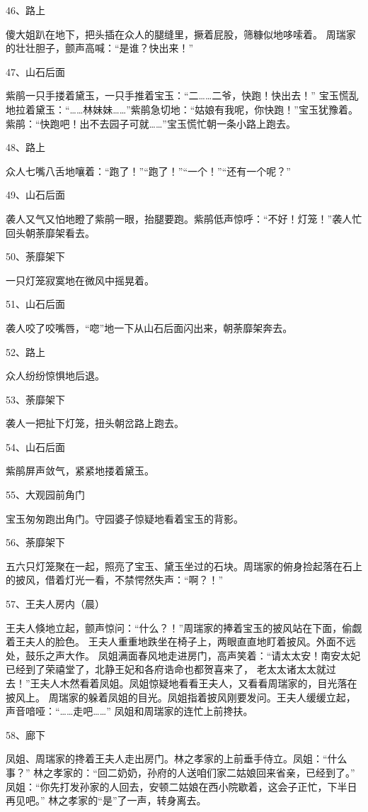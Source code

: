 46、路上\par
傻大姐趴在地下，把头插在众人的腿缝里，撅着屁股，筛糠似地哆嗦着。
周瑞家的壮壮胆子，颤声高喊：“是谁？快出来！”

47、山石后面\par
紫鹃一只手搂着黛玉，一只手推着宝玉：“二……二爷，快跑！快出去！”
宝玉慌乱地拉着黛玉：“……林妹妹……”紫鹃急切地：“姑娘有我呢，你快跑！”宝玉犹豫着。
紫鹃：“快跑吧！出不去园子可就……”宝玉慌忙朝一条小路上跑去。

48、路上\par
众人七嘴八舌地嚷着：“跑了！”“跑了！”“一个！”“还有一个呢？”

49、山石后面\par
袭人又气又怕地瞪了紫鹃一眼，抬腿要跑。紫鹃低声惊呼：“不好！灯笼！”袭人忙回头朝荼靡架看去。 

50、荼靡架下\par
一只灯笼寂寞地在微风中摇晃着。

51、山石后面\par
袭人咬了咬嘴唇，“唿”地一下从山石后面闪出来，朝荼靡架奔去。

52、路上\par
众人纷纷惊惧地后退。

53、荼靡架下\par
袭人一把扯下灯笼，扭头朝岔路上跑去。

54、山石后面\par
紫鹃屏声敛气，紧紧地搂着黛玉。

55、大观园前角门\par
宝玉匆匆跑出角门。守园婆子惊疑地看着宝玉的背影。

56、荼靡架下\par
五六只灯笼聚在一起，照亮了宝玉、黛玉坐过的石块。周瑞家的俯身捡起落在石上的披风，借着灯光一看，不禁愕然失声：“啊？！”

57、王夫人房内（晨）\par
王夫人倏地立起，颤声惊问：“什么？！”周瑞家的捧着宝玉的披风站在下面，偷觑着王夫人的脸色。
王夫人重重地跌坐在椅子上，两眼直直地盯着披风。外面不远处，鼓乐之声大作。
凤姐满面春风地走进房门，高声笑着：“请太太安！南安太妃已经到了荣禧堂了，北静王妃和各府诰命也都贺喜来了，
老太太诸太太就过去！”王夫人木然看着凤姐。凤姐惊疑地看看王夫人，又看看周瑞家的，目光落在披风上。
周瑞家的躲着凤姐的目光。凤姐指着披风刚要发问。王夫人缓缓立起，声音喑哑：“……走吧……”
凤姐和周瑞家的连忙上前搀扶。

58、廊下\par
凤姐、周瑞家的搀着王夫人走出房门。林之孝家的上前垂手侍立。凤姐：“什么事？”
林之孝家的：“回二奶奶，孙府的人送咱们家二姑娘回来省亲，已经到了。”
凤姐：“你先打发孙家的人回去，安顿二姑娘在西小院歇着，这会子正忙，下半日再见吧。”
林之孝家的“是”了一声，转身离去。

